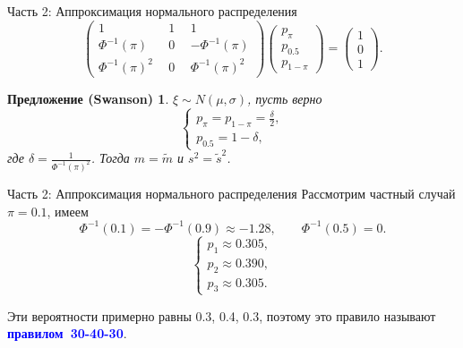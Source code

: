 \documentclass[ucs, notheorems, handout]{beamer}
\newtheorem{proposition}[theorem]{Предложение (Swanson)}
\begin{document}
	\begin{frame}{Часть 2: Аппроксимация нормального распределения}
		\begin{equation*}
			\begin{pmatrix} 1&1&1\\ 
				\Phi^{-1}(\pi)~~ &  0~~  & -\Phi ^{-1}(\pi) \\ 
				\Phi ^{-1}(\pi)^{2}~~& 0~~  &\Phi ^{-1}(\pi)^{2}
			\end{pmatrix} 
			\begin{pmatrix}p_{\pi}\\p_{0.5}\\ p_{1-\pi}\end{pmatrix}= \begin{pmatrix}1\\0\\1\end{pmatrix}.
		\end{equation*}
		
		\begin{proposition}\label{pr7}
			$\xi\sim N(\mu, \sigma)$, пусть верно 
			\begin{equation*}
				\begin{cases}
					p_{\pi} = p_{1-\pi}=\displaystyle{\frac{\delta}{2}},\\ 
					p_{0.5}=1-\delta,
				\end{cases}\label{7}
			\end{equation*}
			где $\delta  = \displaystyle{\frac{1}{\Phi ^{-1}(\pi)^{2}}}$. Тогда $m=\tilde{m}$ и $s^{2} = \tilde{s}^{2}$.
		\end{proposition}
	
	\end{frame}
	
	\begin{frame}{Часть 2: Аппроксимация нормального распределения}
		Рассмотрим частный случай $\pi = 0.1$, имеем 
		$$\Phi ^{-1}(0.1) = -\Phi ^{-1}(0.9) \approx  -1.28, \qquad \Phi ^{-1}(0.5) = 0. $$
		\begin{equation*}
			\begin{cases}
				p_{1}\approx 0.305, \\ 
				p_{2}\approx 0.390,  \\ 
				p_{3}\approx 0.305.
			\end{cases}
		\end{equation*}
		
		Эти вероятности примерно равны 0.3, 0.4, 0.3, поэтому это правило называют \textcolor{blue}{\hbox{\textbf{правилом 30-40-30}}}.
		
		
	\end{frame}	
	
\end{document}
